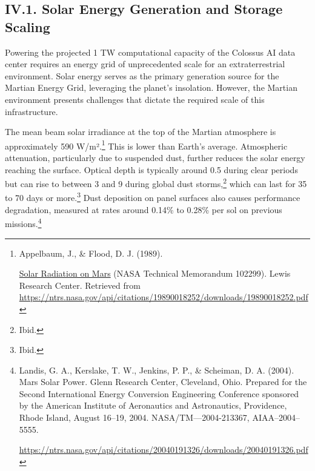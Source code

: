 \documentclass[fontsize=10pt, oneside, DIV=calc]{scrartcl}
\begin{document}
\subsection*{IV.1. Solar Energy Generation and Storage Scaling}



\medskip

\noindent
Powering the projected 1 TW computational capacity of the Colossus AI data center requires an energy grid of unprecedented scale for an extraterrestrial environment. Solar energy serves as the primary generation source for the Martian Energy Grid, leveraging the planet's insolation. However, the Martian environment presents challenges that dictate the required scale of this infrastructure.

\medskip

\noindent
The mean beam solar irradiance at the top of the Martian atmosphere is approximately 590 W/m².\footnote{Appelbaum, J., \& Flood, D. J. (1989). 







\href{https://ntrs.nasa.gov/api/citations/19890018252/downloads/19890018252.pdf}\url{Solar Radiation on Mars} (NASA Technical Memorandum 102299). Lewis Research Center. Retrieved from \url{https://ntrs.nasa.gov/api/citations/19890018252/downloads/19890018252.pdf}} This is lower than Earth's average. Atmospheric attenuation, particularly due to suspended dust, further reduces the solar energy reaching the surface. Optical depth is typically around 0.5 during clear periods but can rise to between 3 and 9 during global dust storms,\footnote{Ibid.} which can last for 35 to 70 days or more.\footnote{Ibid.} Dust deposition on panel surfaces also causes performance degradation, measured at rates around 0.14\% to 0.28\% per sol on previous missions.\footnote{Landis, G. A., Kerslake, T. W., Jenkins, P. P., \& Scheiman, D. A. (2004). Mars Solar Power. Glenn Research Center, Cleveland, Ohio. Prepared for the Second International Energy Conversion Engineering Conference sponsored by the American Institute of Aeronautics and Astronautics, Providence, Rhode Island, August 16–19, 2004. NASA/TM—2004-213367, AIAA–2004–5555. 







\href{https://ntrs.nasa.gov/api/citations/20040191326/downloads/20040191326.pdf}\url{https://ntrs.nasa.gov/api/citations/20040191326/downloads/20040191326.pdf}}
\end{document}

